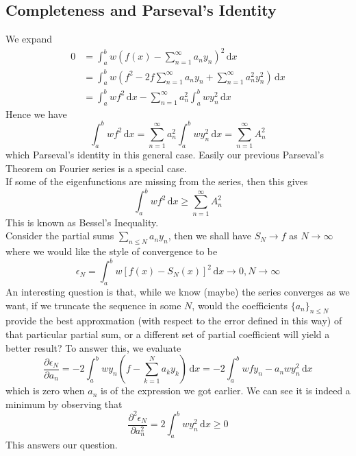 \subsection{Completeness and Parseval's Identity}
We expand
\begin{align*}
    0&=\int_a^bw\left( f(x)-\sum_{n=1}^\infty a_ny_n \right)^2\,\mathrm dx\\
    &=\int_a^bw\left( f^2-2f\sum_{n=1}^\infty a_ny_n+\sum_{n=1}^\infty a_n^2y_n^2 \right)\,\mathrm dx\\
    &=\int_a^bwf^2\,\mathrm dx-\sum_{n=1}^\infty a_n^2\int_a^bwy_n^2\,\mathrm dx
\end{align*}
Hence we have
$$\int_a^bwf^2\,\mathrm dx=\sum_{n=1}^\infty a_n^2\int_a^bwy_n^2\,\mathrm dx=\sum_{n=1}^\infty A_n^2$$
which Parseval's identity in this general case.
Easily our previous Parseval's Theorem on Fourier series is a special case.\\
If some of the eigenfunctions are missing from the series, then this gives
$$\int_a^bwf^2\,\mathrm dx\ge\sum_{n=1}^\infty A_n^2$$
This is known as Bessel's Inequality.\\
Consider the partial sums $\sum_{n\le N}a_ny_n$, then we shall have $S_N\to f$ as $N\to\infty$ where we would like the style of convergence to be
$$\epsilon_N=\int_a^bw[f(x)-S_N(x)]^2\,\mathrm dx\to 0,N\to\infty$$
An interesting question is that, while we know (maybe) the series converges as we want, if we truncate the sequence in some $N$, would the coefficients $\{a_n\}_{n\le N}$ provide the best approxmation (with respect to the error defined in this way) of that particular partial sum, or a different set of partial coefficient will yield a better result?
To answer this, we evaluate
$$\frac{\partial\epsilon_N}{\partial a_n}=-2\int_a^bwy_n\left( f-\sum_{k=1}^Na_ky_k \right)\,\mathrm dx=-2\int_a^bwfy_n-a_nwy_n^2\,\mathrm dx$$
which is zero when $a_n$ is of the expression we got earlier.
We can see it is indeed a minimum by observing that
$$\frac{\partial^2\epsilon_N}{\partial a_n^2}=2\int_a^bwy_n^2\,\mathrm dx\ge 0$$
This answers our question.
